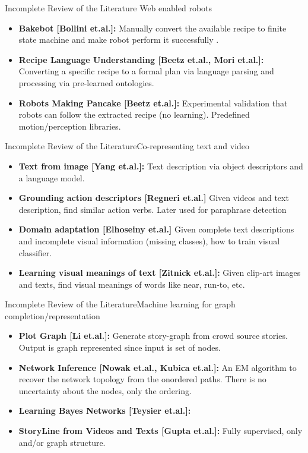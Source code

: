 \begin{frame}{Incomplete Review of the Literature}{ Web enabled robots}
\begin{itemize}
\item {\bf Bakebot [Bollini et.al.]:} Manually convert the available recipe to finite state machine and make robot perform it successfully .
\item {\bf Recipe Language Understanding [Beetz et.al., Mori et.al.]:} Converting a specific recipe to a formal plan via language parsing and processing via pre-learned ontologies.
\item {\bf Robots Making Pancake [Beetz et.al.]:} Experimental validation that robots can follow the extracted recipe (no learning). Predefined motion/perception libraries.
\end{itemize}
\end{frame}


\begin{frame}{Incomplete Review of the Literature}{Co-representing text and video}
\begin{itemize}
\item {\bf Text from image [Yang et.al.]:} Text description via object descriptors and a language model.
\item {\bf Grounding action descriptors [Regneri et.al.]} Given videos and text description, find similar action verbs. Later used for paraphrase detection
\item {\bf Domain adaptation [Elhoseiny et.al.]} Given complete text descriptions and incomplete visual information (missing classes), how to train visual classifier.
\item {\bf Learning visual meanings of text [Zitnick et.al.]:} Given clip-art images and texts, find visual meanings of words like near, run-to, etc.
\end{itemize}
\end{frame}

\begin{frame}{Incomplete Review of the Literature}{Machine learning for graph completion/representation}
\begin{itemize}
\item {\bf Plot Graph [Li et.al.]:} Generate story-graph from crowd source stories. Output is graph represented
since input is set of nodes.
\item {\bf Network Inference [Nowak et.al., Kubica et.al.]:} An EM algorithm to recover the network topology from the onordered paths. There is no uncertainty about the nodes, only the ordering.
\item {\bf Learning Bayes Networks [Teysier et.al.]:}
\item {\bf StoryLine from Videos and Texts [Gupta et.al.]:} Fully supervised, only and/or graph structure.
\end{itemize}
\end{frame}



